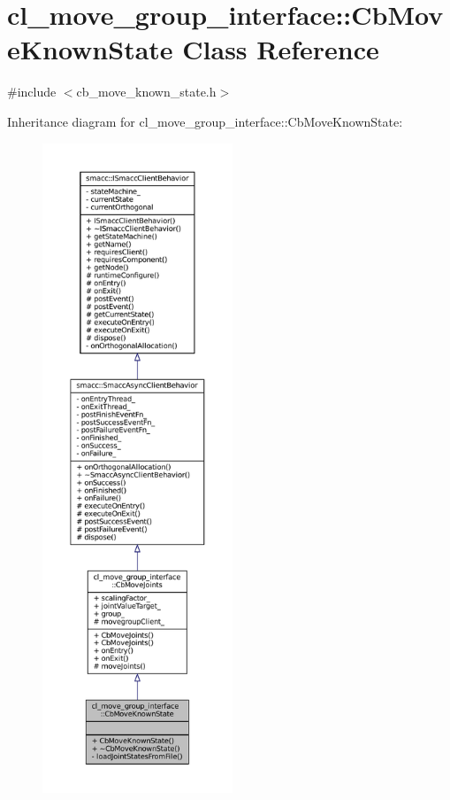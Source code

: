 \hypertarget{classcl__move__group__interface_1_1CbMoveKnownState}{}\section{cl\+\_\+move\+\_\+group\+\_\+interface\+:\+:Cb\+Move\+Known\+State Class Reference}
\label{classcl__move__group__interface_1_1CbMoveKnownState}


{\ttfamily \#include $<$cb\+\_\+move\+\_\+known\+\_\+state.\+h$>$}



Inheritance diagram for cl\+\_\+move\+\_\+group\+\_\+interface\+:\+:Cb\+Move\+Known\+State\+:
\nopagebreak
\begin{figure}[H]
\begin{center}
\leavevmode
\includegraphics[height=550pt]{classcl__move__group__interface_1_1CbMoveKnownState__inherit__graph}
\end{center}
\end{figure}


